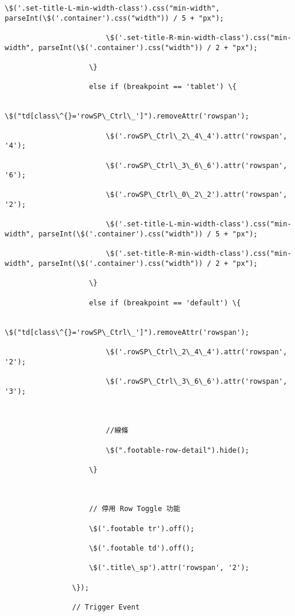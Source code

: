 \documentclass[11pt]{article}
\begin{document}
\begin{Verbatim}[commandchars=\\\{\}]
                        \$('.set-title-L-min-width-class').css("min-width", parseInt(\$('.container').css("width")) / 5 + "px");

                        \$('.set-title-R-min-width-class').css("min-width", parseInt(\$('.container').css("width")) / 2 + "px");

                    \}

                    else if (breakpoint == 'tablet') \{

                        \$("td[class\^{}='rowSP\_Ctrl\_']").removeAttr('rowspan');

                        \$('.rowSP\_Ctrl\_2\_4\_4').attr('rowspan', '4');

                        \$('.rowSP\_Ctrl\_3\_6\_6').attr('rowspan', '6');

                        \$('.rowSP\_Ctrl\_0\_2\_2').attr('rowspan', '2');

                        \$('.set-title-L-min-width-class').css("min-width", parseInt(\$('.container').css("width")) / 5 + "px");

                        \$('.set-title-R-min-width-class').css("min-width", parseInt(\$('.container').css("width")) / 2 + "px");

                    \}

                    else if (breakpoint == 'default') \{

                        \$("td[class\^{}='rowSP\_Ctrl\_']").removeAttr('rowspan');

                        \$('.rowSP\_Ctrl\_2\_4\_4').attr('rowspan', '2');

                        \$('.rowSP\_Ctrl\_3\_6\_6').attr('rowspan', '3');



                        //線條

                        \$(".footable-row-detail").hide();

                    \}



                    // 停用 Row Toggle 功能

                    \$('.footable tr').off();

                    \$('.footable td').off();

                    \$('.title\_sp').attr('rowspan', '2');

                \});

                // Trigger Event


\end{Verbatim}
\end{document}
